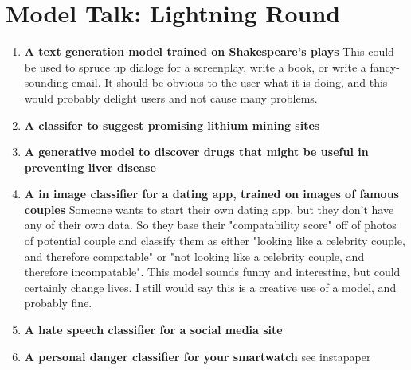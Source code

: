 \section{Model Talk: Lightning Round}

\begin{enumerate}
    \item \textbf{A text generation model trained on Shakespeare's plays} This could be used to spruce up dialoge for a screenplay, write a book, or write a fancy-sounding email. It should be obvious to the user what it is doing, and this would probably delight users and not cause many problems.
    \item \textbf{A classifer to suggest promising lithium mining sites}
    \item \textbf{A generative model to discover drugs that might be useful in preventing liver disease}
    \item \textbf{A in image classifier for a dating app, trained on images of famous couples} Someone wants to start their own dating app, but they don't have any of their own data. So they base their "compatability score" off of photos of potential couple and classify them as either "looking like a celebrity couple, and therefore compatable" or "not looking like a celebrity couple, and therefore incompatable". This model sounds funny and interesting, but could certainly change lives. I still would say this is a creative use of a model, and probably fine.
    \item \textbf{A hate speech classifier for a social media site}
    \item \textbf{A personal danger classifier for your smartwatch} see instapaper


\end{enumerate}
